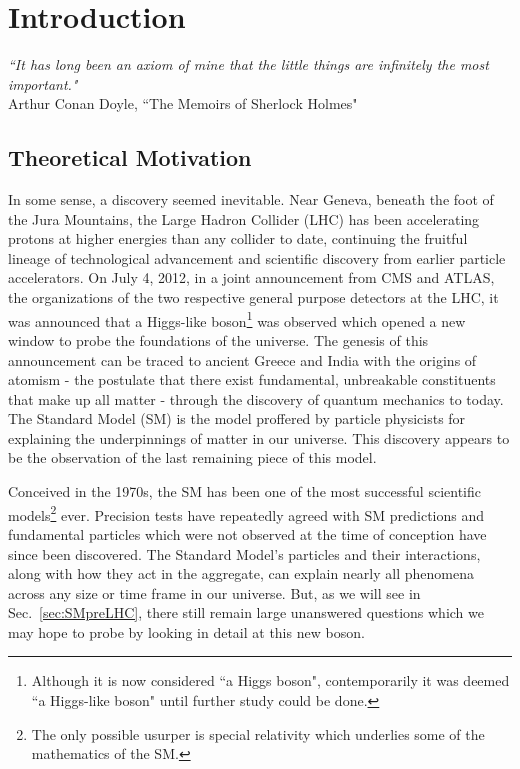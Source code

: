 \chapter{Introduction}
\label{sec:intro}

\begin{center}
\begin{footnotesize}
{ \it{``It has long been an axiom of mine that the little things are infinitely the most important."}}\\
Arthur Conan Doyle, ``The Memoirs of Sherlock Holmes"\\
\end{footnotesize}
\end{center}

\section{Theoretical Motivation}
\label{sec:introduction}

In some sense, a discovery seemed inevitable. Near Geneva, beneath the foot of the Jura Mountains, the Large Hadron Collider (LHC) has been accelerating protons at higher energies than any collider to date, continuing the fruitful lineage of technological advancement and scientific discovery from earlier particle accelerators. On July 4, 2012, in a joint announcement from CMS and ATLAS, the organizations of the two respective general purpose detectors at the LHC, it was announced that a Higgs-like boson\footnote{Although it is now considered ``a Higgs boson", contemporarily it was deemed ``a Higgs-like boson" until further study could be done.} was observed which opened a new window to probe the foundations of the universe. The genesis of this announcement can be traced to ancient Greece and India with the origins of atomism - the postulate that there exist fundamental, unbreakable constituents that make up all matter - through the discovery of quantum mechanics to today. The Standard Model (SM) is the model proffered by particle physicists for explaining the underpinnings of matter in our universe. This discovery appears to be the observation of the last remaining piece of this model.

Conceived in the 1970s, the SM has been one of the most successful scientific models\footnote{The only possible usurper is special relativity which underlies some of the mathematics of the SM.} ever. Precision tests have repeatedly agreed with SM predictions and fundamental particles which were not observed at the time of conception have since been discovered. The Standard Model's particles and their interactions, along with how they act in the aggregate, can explain nearly all phenomena across any size or time frame in our universe. But, as we will see in Sec.~\ref{sec:SMpreLHC}, there still remain large unanswered questions which we may hope to probe by looking in detail at this new boson.

